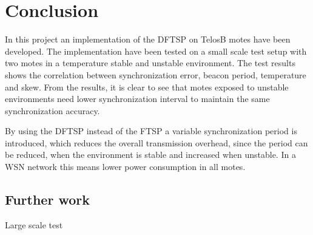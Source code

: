 \documentclass[Main]{subfiles}
\begin{document}
\section{Conclusion} %
\label{sec:conclusion}
	In this project an implementation of the DFTSP on TelosB motes have been developed. 
	The implementation have been tested on a small scale test setup with two motes in a temperature stable and unstable environment. 
	The test results shows the correlation between synchronization error, beacon period, temperature and skew.
	From the results, it is clear to see that motes exposed to unstable environments need lower synchronization interval to maintain the same synchronization accuracy.

	By using the DFTSP instead of the FTSP a variable synchronization period is introduced, which reduces the overall transmission overhead, since the period can be reduced, when the environment is stable and increased when unstable.
	In a WSN network this means lower power consumption in all motes.

	\subsection{Further work} %
	\label{sub:further_work}
		Large scale test



\end{document}
